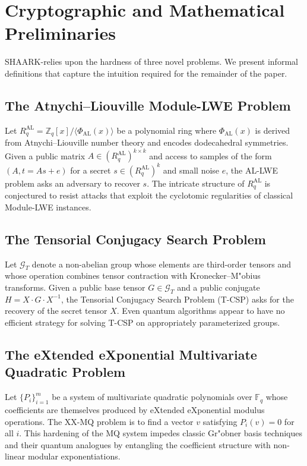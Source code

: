 \documentclass[11pt]{article}
\begin{document}
\section{Cryptographic and Mathematical Preliminaries}
SHAARK-\Xi relies upon the hardness of three novel problems. We present informal definitions that capture the intuition required for the remainder of the paper.

\subsection{The Atnychi--Liouville Module-LWE Problem}
Let $R^{\mathrm{AL}}_q = \mathbb{Z}_q[x]/\langle \Phi_{\mathrm{AL}}(x) \rangle$ be a polynomial ring where $\Phi_{\mathrm{AL}}(x)$ is derived from Atnychi--Liouville number theory and encodes dodecahedral symmetries. Given a public matrix $A \in (R^{\mathrm{AL}}_q)^{k \times k}$ and access to samples of the form $(A, t = As + e)$ for a secret $s \in (R^{\mathrm{AL}}_q)^k$ and small noise $e$, the AL-LWE problem asks an adversary to recover $s$. The intricate structure of $R^{\mathrm{AL}}_q$ is conjectured to resist attacks that exploit the cyclotomic regularities of classical Module-LWE instances.

\subsection{The Tensorial Conjugacy Search Problem}
Let $\mathcal{G}_T$ denote a non-abelian group whose elements are third-order tensors and whose operation combines tensor contraction with Kronecker--M"obius transforms. Given a public base tensor $G \in \mathcal{G}_T$ and a public conjugate $H = X \cdot G \cdot X^{-1}$, the Tensorial Conjugacy Search Problem (T-CSP) asks for the recovery of the secret tensor $X$. Even quantum algorithms appear to have no efficient strategy for solving T-CSP on appropriately parameterized groups.

\subsection{The eXtended eXponential Multivariate Quadratic Problem}
Let $\{ P_i \}_{i=1}^m$ be a system of multivariate quadratic polynomials over $\mathbb{F}_q$ whose coefficients are themselves produced by eXtended eXponential modulus operations. The XX-MQ problem is to find a vector $v$ satisfying $P_i(v) = 0$ for all $i$. This hardening of the MQ system impedes classic Gr"obner basis techniques and their quantum analogues by entangling the coefficient structure with non-linear modular exponentiations.
\end{document}
